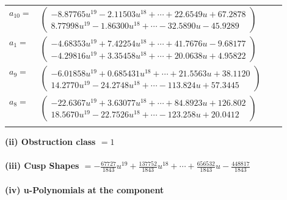 \documentclass[1p]{elsarticle_modified}
\theoremstyle{definition}
\begin{document}
\begin{tabular}{m{7pt} m{180pt} m{7pt} m{180pt} }
\flushright $a_{10}=$&$\begin{pmatrix}-8.87765 u^{19}-2.11503 u^{18}+\cdots+22.6549 u+67.2878\\8.77998 u^{19}-1.86300 u^{18}+\cdots-32.5890 u-45.9289\end{pmatrix}$ \\
\flushright $a_{1}=$&$\begin{pmatrix}-4.68353 u^{19}+7.42254 u^{18}+\cdots+41.7676 u-9.68177\\-4.29816 u^{19}+3.35458 u^{18}+\cdots+20.0638 u+4.95822\end{pmatrix}$ \\
\flushright $a_{9}=$&$\begin{pmatrix}-6.01858 u^{19}+0.685431 u^{18}+\cdots+21.5563 u+38.1120\\14.2770 u^{19}-24.2748 u^{18}+\cdots-113.824 u+57.3445\end{pmatrix}$ \\
\flushright $a_{8}=$&$\begin{pmatrix}-22.6367 u^{19}+3.63077 u^{18}+\cdots+84.8923 u+126.802\\18.5670 u^{19}-22.7526 u^{18}+\cdots-123.258 u+20.0412\end{pmatrix}$\\&\end{tabular}
\flushleft \textbf{(ii) Obstruction class $= 1$}\\~\\
\flushleft \textbf{(iii) Cusp Shapes $= -\frac{67727}{1843} u^{19}+\frac{137752}{1843} u^{18}+\cdots+\frac{656532}{1843} u-\frac{448817}{1843}$}\\~\\
\newpage\renewcommand{\arraystretch}{1}
\flushleft \textbf{(iv) u-Polynomials at the component}\newline \\
\end{document}
